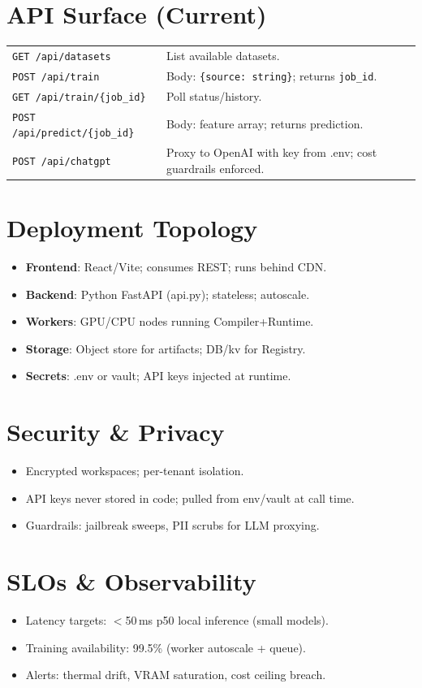 \documentclass[11pt]{article}
\begin{document}
\section{API Surface (Current)}
\begin{tabular}{p{} p{}}
\texttt{GET /api/datasets} & List available datasets. \\
\texttt{POST /api/train} & Body: \texttt{\{source: string\}}; returns \texttt{job\_id}. \\
\texttt{GET /api/train/\{job\_id\}} & Poll status/history. \\
\texttt{POST /api/predict/\{job\_id\}} & Body: feature array; returns prediction. \\
\texttt{POST /api/chatgpt} & Proxy to OpenAI with key from .env; cost guardrails enforced. \\
\end{tabular}

\section{Deployment Topology}
\begin{itemize}
  \item \textbf{Frontend}: React/Vite; consumes REST; runs behind CDN.
  \item \textbf{Backend}: Python FastAPI (api.py); stateless; autoscale.
  \item \textbf{Workers}: GPU/CPU nodes running Compiler+Runtime.
  \item \textbf{Storage}: Object store for artifacts; DB/kv for Registry.
  \item \textbf{Secrets}: .env or vault; API keys injected at runtime.
\end{itemize}

\section{Security \& Privacy}
\begin{itemize}
  \item Encrypted workspaces; per-tenant isolation.
  \item API keys never stored in code; pulled from env/vault at call time.
  \item Guardrails: jailbreak sweeps, PII scrubs for LLM proxying.
\end{itemize}

\section{SLOs \& Observability}
\begin{itemize}
  \item Latency targets: $<$50\,ms p50 local inference (small models).
  \item Training availability: 99.5\% (worker autoscale + queue).
  \item Alerts: thermal drift, VRAM saturation, cost ceiling breach.
\end{itemize}
\end{document}
